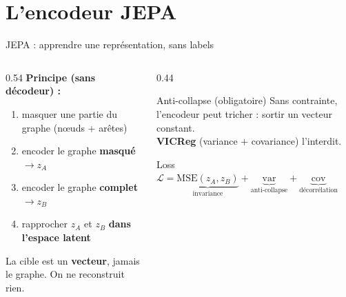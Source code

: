 \documentclass[aspectratio=169,11pt]{beamer}
\newcommand{\hl}[1]{\textcolor{jblue}{\textbf{#1}}}
\begin{document}
\section{L'encodeur JEPA}
\begin{frame}{JEPA : apprendre une représentation, sans labels}
  \begin{columns}[T]
    \begin{column}{0.54\textwidth}
      \textbf{Principe (sans décodeur) :}
      \begin{enumerate}\small
        \item masquer une partie du graphe (nœuds + arêtes)
        \item encoder le graphe \textbf{masqué} $\to z_A$
        \item encoder le graphe \textbf{complet} $\to z_B$
        \item rapprocher $z_A$ et $z_B$ \hl{dans l'espace latent}
      \end{enumerate}
      \vspace{2mm}
      \footnotesize La cible est un \textbf{vecteur}, jamais le graphe.
      On ne reconstruit rien.
    \end{column}
    \begin{column}{0.44\textwidth}
      \begin{block}{Anti-collapse (obligatoire)}
        \footnotesize
        Sans contrainte, l'encodeur peut tricher : sortir un vecteur constant.
        \\ \hl{VICReg} (variance + covariance) l'interdit.
      \end{block}
      \begin{exampleblock}{Loss}
        \scriptsize
        $\mathcal{L} = \underbrace{\mathrm{MSE}(z_A,z_B)}_{\text{invariance}}
          + \underbrace{\mathrm{var}}_{\text{anti-collapse}}
          + \underbrace{\mathrm{cov}}_{\text{décorrélation}}$
      \end{exampleblock}
    \end{column}
  \end{columns}
\end{frame}
\end{document}
